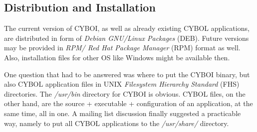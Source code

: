 %
%
%
%
%
%
%

\subsection{Distribution and Installation}
\label{distribution_and_installation_heading}

The current version of CYBOI, as well as already existing CYBOL applications,
are distributed in form of \emph{Debian GNU/Linux Packages} (DEB). Future
versions may be provided in \emph{RPM/ Red Hat Package Manager} (RPM) format as
well. Also, installation files for other OS like Windows might be available
then.

One question that had to be answered was where to put the CYBOI binary, but
also CYBOL application files in UNIX \emph{Filesystem Hierarchy Standard} (FHS)
\cite{fhs} directories. The \emph{/usr/bin} directory for CYBOI is obvious.
CYBOL files, on the other hand, are the source + executable + configuration of
an application, at the same time, all in one. A mailing list discussion
\cite[June 2005]{debiandevel} finally suggested a practicable way, namely to
put all CYBOL applications to the \emph{/usr/share/} directory.
